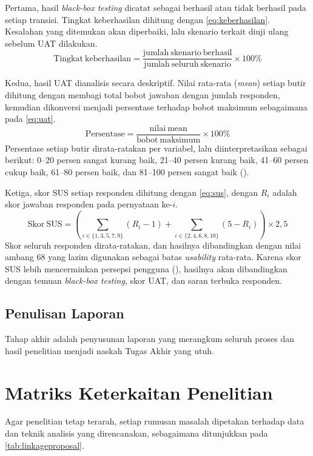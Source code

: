 Pertama, hasil \textit{black-box testing} dicatat sebagai berhasil atau tidak
berhasil pada setiap transisi. Tingkat keberhasilan dihitung dengan
\cref{eq:keberhasilan}. Kesalahan yang ditemukan akan diperbaiki, lalu skenario
terkait diuji ulang sebelum UAT dilakukan.
\begin{equation}
    \label{eq:keberhasilan}
    \mathrm{Tingkat\ keberhasilan} =
    \frac{\mathrm{jumlah\ skenario\ berhasil}}{\mathrm{jumlah\ seluruh\ skenario}}
    \times 100\%
\end{equation}

Kedua, hasil UAT dianalisis secara deskriptif. Nilai rata-rata (\textit{mean})
setiap butir dihitung dengan membagi total bobot jawaban dengan jumlah
responden, kemudian dikonversi menjadi persentase terhadap bobot maksimum
sebagaimana pada \cref{eq:uat}.
\begin{equation}
    \label{eq:uat}
    \mathrm{Persentase} = \frac{\mathrm{nilai\ mean}}{\mathrm{bobot\ maksimum}}
    \times 100\%
\end{equation}
Persentase setiap butir dirata-ratakan per variabel, lalu diinterpretasikan
sebagai berikut: 0--20 persen sangat kurang baik, 21--40 persen kurang baik,
41--60 persen cukup baik, 61--80 persen baik, dan 81--100 persen sangat baik
(\cite{AliyahAliyah2025}).

Ketiga, skor SUS setiap responden dihitung dengan \cref{eq:sus}, dengan $R_i$
adalah skor jawaban responden pada pernyataan ke-$i$.
\begin{equation}
    \label{eq:sus}
    \mathrm{Skor\ SUS} = \left( \sum_{i \in \{1,3,5,7,9\}} (R_i - 1)
    + \sum_{i \in \{2,4,6,8,10\}} (5 - R_i) \right) \times 2{,}5
\end{equation}
Skor seluruh responden dirata-ratakan, dan hasilnya dibandingkan dengan nilai
ambang 68 yang lazim digunakan sebagai batas \textit{usability} rata-rata. Karena
skor SUS lebih mencerminkan persepsi pengguna (\cite{Fiandhika2024}),
hasilnya akan dibandingkan dengan temuan \textit{black-box testing}, skor UAT,
dan saran terbuka responden.

\subsection{Penulisan Laporan}
Tahap akhir adalah penyusunan laporan yang merangkum seluruh proses dan hasil
penelitian menjadi naskah Tugas Akhir yang utuh.

\section{Matriks Keterkaitan Penelitian}
Agar penelitian tetap terarah, setiap rumusan masalah dipetakan terhadap data dan
teknik analisis yang direncanakan, sebagaimana ditunjukkan pada
\cref{tab:linkageproposal}.

